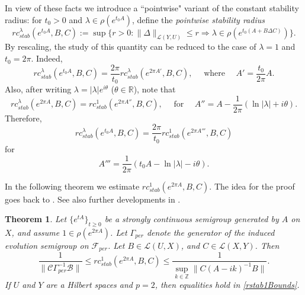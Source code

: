 \documentclass[10pt,psamsfonts,leqno]{siamltex}
\newtheorem{thm}[prop]{Theorem}
\newcommand{\bbR}{\mathbb{R}}
\newcommand{\bbZ}{\mathbb{Z}}
\newcommand{\calB}{\mathcal{B}}
\newcommand{\calC}{\mathcal{C}}
\newcommand{\lb}{\label}
\newcommand{\rcstab}{rc_{stab}}
\newcommand{\Gammaper}{\Gamma_{per}}
\newcommand{\Fper}{{\mathcal{F}_{per}}}
\begin{document}
In view of these facts we introduce a ``pointwise" variant of the
constant stability radius:
for $t_0>0$ and  $\lambda\in\rho(e^{t_0 A})$,
define the {\em pointwise stability radius}
\[
\rcstab^\lambda(e^{t_0 A},B,C):=
\sup\{r>0: \|\Delta\|_{\mathcal{L}(Y,U)}\le r
\Rightarrow \lambda\in\rho(e^{t_0(A+B\Delta C)})\}.
\]
By rescaling,
the study of this quantity can be reduced to the case of $\lambda=1$ and
$t_0=2\pi$.  Indeed,
\[\rcstab^\lambda(e^{t_0 A},B,C)=
\frac{2\pi}{t_0}\rcstab^\lambda(e^{2\pi A'},B,C),\quad
\mbox{ where }\quad A'=\frac{t_0}{2\pi}A.\]
Also, after writing
$\lambda=|\lambda|e^{i\theta}$
($\theta\in\bbR$), note that
\[\rcstab^\lambda(e^{2\pi A},B,C)=\rcstab^1(e^{2\pi A''},B,C),\quad
\mbox{ for }\quad
A''=A-\frac{1}{2\pi}(\ln|\lambda|+i\theta).\]
Therefore,
$$
\rcstab^\lambda(e^{t_0 A},B,C)=\frac{2\pi}{t_0}\rcstab^1(e^{2\pi
A'''},B,C)
$$
for
$$
A'''=\frac{1}{2\pi}(t_0A-\ln|\lambda|-i\theta).
$$

In the following theorem we estimate
$\rcstab^1(e^{2\pi A},B,C)$.  The idea for the proof goes back to
\cite{HP94}.
See also further developments in \cite{FishvN}.

\begin{thm}\lb{PtwiseBounds}
Let $\{e^{tA}\}_{t\ge0}$ be a strongly continuous semigroup generated
by $A$ on $X$, and assume $1\in\rho(e^{2\pi A})$.  Let $\Gammaper$
denote the
generator of the induced evolution semigroup on $\Fper$.
Let $B\in \mathcal{L}(U,X)$, and $C\in \mathcal{L}(X,Y)$. Then
\begin{equation}\lb{rstab1Bounds}
\frac{1}{\|\calC\Gammaper^{-1}\calB\|}
\le \rcstab^1(e^{2\pi A},B,C)
\le \frac{1}{\sup_{k\in\bbZ}\|C(A-ik)^{-1}B\|}.
\end{equation}
If $U$ and $Y$ are a Hilbert spaces and $p=2$, then equalities hold in
\eqref{rstab1Bounds}.
\end{thm}
\end{document}
